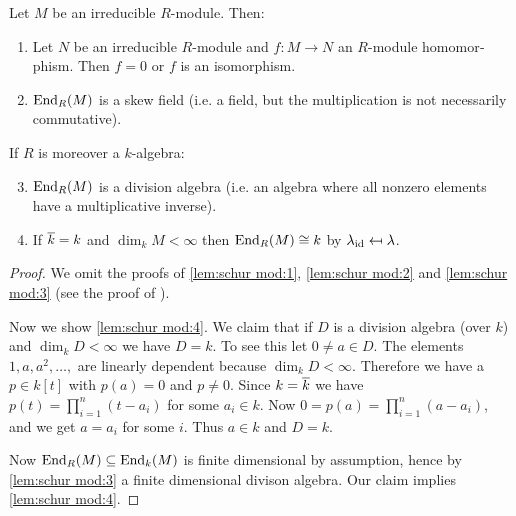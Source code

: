 \documentclass[12pt,a4paper]{scrartcl}
\theoremstyle{cplain}
\theoremstyle{cplain}
\theoremstyle{cplain}
\theoremstyle{definition}
\begin{document}
\begin{otherlanguage}{english}
\begin{lem} \label{lem:schur mod}
  Let $M$ be an irreducible $R$-module. Then:
  \begin{enumerate}
    \item Let $N$ be an irreducible $R$-module and $f\colon M\to N$ an $R$-module homomorphism. Then $f=0$ or $f$ is an isomorphism. \label{lem:schur mod:1}
    \item $\operatorname{End}_R(M)$ is a skew field (i.e. a field, but the multiplication is not necessarily commutative). \label{lem:schur mod:2}
  \end{enumerate}
  If $R$ is moreover a $k$-algebra:
  \begin{enumerate}
    \setcounter{enumi}{2}
    \item $\operatorname{End}_R(M)$ is a division algebra (i.e. an algebra where all nonzero elements have a multiplicative inverse). \label{lem:schur mod:3}
    \item If $\overline k = k$ and $\dim_k M <\infty $ then $\operatorname{End}_R(M) \cong k$ by $\lambda_{\operatorname{id}} \mapsfrom \lambda$. \label{lem:schur mod:4}
  \end{enumerate}
\end{lem}
\begin{proof}
  We omit the proofs of \ref{lem:schur mod:1}, \ref{lem:schur mod:2} and \ref{lem:schur mod:3} (see the proof of ).
  
  Now we show \ref{lem:schur mod:4}. We claim that if $D$ is a division algebra (over $k$) and $\dim_kD<\infty$ we have $D=k$. To see this let $0\neq a \in D$. The elements $1,a,a^2,\ldots,$ are linearly dependent because $\dim_kD < \infty$. Therefore we have a $p \in k[t]$ with $p(a) = 0$ and $p\neq 0$. Since $k=\overline k$ we have $p(t) = \prod_{i=1}^n(t-a_i)$ for some $a_i \in k$. Now $0 = p(a) = \prod_{i=1}^n(a-a_i)$, and we get $a=a_i$ for some $i$. Thus $a \in k$ and $D=k$.
  
  Now $\operatorname{End}_R(M) \subseteq \operatorname{End}_k(M)$ is finite dimensional by assumption, hence by \ref{lem:schur mod:3} a finite dimensional divison algebra. Our claim implies \ref{lem:schur mod:4}.
\end{proof}


\end{otherlanguage}
\end{document}
